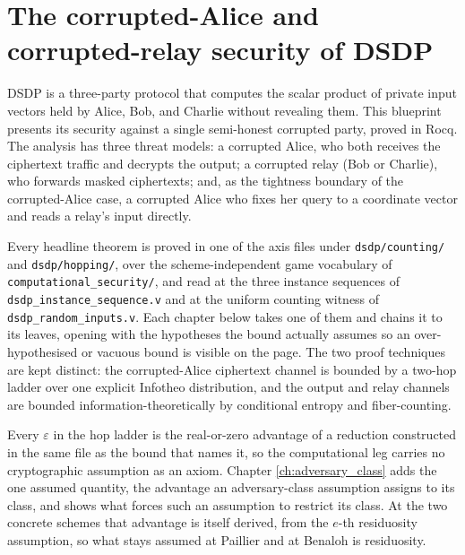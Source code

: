 %

\chapter{The corrupted-Alice and corrupted-relay security of DSDP}

DSDP is a three-party protocol that computes the scalar product of private input
vectors held by Alice, Bob, and Charlie without revealing them. This blueprint
presents its security against a single semi-honest corrupted party, proved in
Rocq. The analysis has three threat models: a corrupted Alice, who both receives
the ciphertext traffic and decrypts the output; a corrupted relay (Bob or
Charlie), who forwards masked ciphertexts; and, as the tightness boundary of the
corrupted-Alice case, a corrupted Alice who fixes her query to a coordinate
vector and reads a relay's input directly.

Every headline theorem is proved in one of the axis files under
\texttt{dsdp/counting/} and \texttt{dsdp/hopping/}, over the scheme-independent
game vocabulary of \texttt{computational\_security/}, and read at the three
instance sequences of \texttt{dsdp\_instance\_sequence.v} and at the uniform
counting witness of \texttt{dsdp\_random\_inputs.v}. Each chapter below takes
one of them and chains it
to its leaves, opening with the hypotheses the bound actually assumes so an
over-hypothesised or vacuous bound is visible on the page. The two proof
techniques are kept distinct: the corrupted-Alice ciphertext channel is bounded
by a two-hop ladder over one explicit Infotheo distribution, and the output and
relay channels are bounded information-theoretically by conditional entropy and
fiber-counting.

Every $\varepsilon$ in the hop ladder is the real-or-zero advantage of a
reduction constructed in the same file as the bound that names it, so the
computational leg carries no cryptographic assumption as an axiom. Chapter
\ref{ch:adversary_class} adds the one assumed quantity, the advantage an
adversary-class assumption assigns to its class, and shows what forces such an
assumption to restrict its class. At the two concrete schemes that advantage is
itself derived, from the $e$-th residuosity assumption, so what stays assumed
at Paillier and at Benaloh is residuosity.

